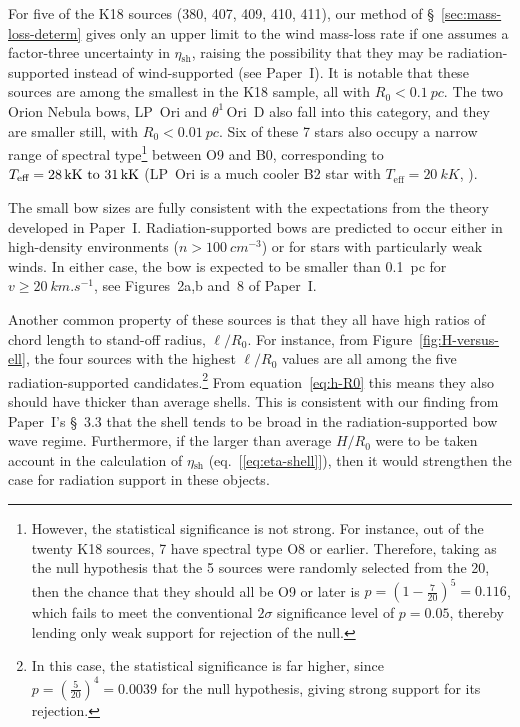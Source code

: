 \documentclass[useAMS, usenatbib, a4paper]{mnras}
\newcommand{\thD}{\(\theta^1\)\,Ori~D}
\newcommand\shell{\ensuremath{_{\text{sh}}}}
\begin{document}
For five of the K18 sources (380, 407, 409, 410, 411), our method of
\S~\ref{sec:mass-loss-determ} gives only an upper limit to the wind
mass-loss rate if one assumes a factor-three uncertainty in
\(\eta\shell\), raising the possibility that they may be
radiation-supported instead of wind-supported (see Paper~I).  It is
notable that these sources are among the smallest in the K18 sample,
all with \(R_0 < \SI{0.1}{pc}\).  The two Orion Nebula bows, LP~Ori
and \thD{} also fall into this category, and they are smaller still,
with \(R_0 < \SI{0.01}{pc}\).  Six of these 7 stars also occupy a
narrow range of spectral type\footnote{%
  However, the statistical significance is not strong.  For
  instance, out of the twenty K18 sources, 7 have spectral type O8 or
  earlier.  Therefore, taking as the null hypothesis that the 5
  sources were randomly selected from the 20, then the chance that
  they should all be O9 or later is
  \(p = (1 - \frac{7}{20})^5 = 0.116\), which fails to meet the
  conventional \(2\sigma\) significance level of \(p = 0.05\),
  thereby lending only weak support for rejection of the null.} %
between O9 and B0, corresponding to
\(T_{\text{eff}} = \text{\SIrange{28}{31}{kK}}\) (LP~Ori is a much
cooler B2 star with \(T_{\text{eff}} = \SI{20}{kK}\),
\citealp{Petit:2008a, Alecian:2013a}).

The small bow sizes are fully consistent with the expectations from
the theory developed in Paper~I.  Radiation-supported bows are predicted
to occur either in high-density environments
(\(n > \SI{100}{cm^{-3}}\)) or for stars with particularly weak winds.
In either case, the bow is expected to be smaller than \SI{0.1}{pc}
for \(v \ge \SI{20}{km.s^{-1}}\), see Figures~2a,b and~8 of
Paper~I.\@

Another common property of these sources is that they all have high
ratios of chord length to stand-off radius, \(\ell/R_0\).  For
instance, from Figure~\ref{fig:H-versus-ell}, the four sources with
the highest \(\ell/R_0\) values are all among the five
radiation-supported candidates.\footnote{%
  In this case, the statistical significance is far higher, since
  \(p = (\frac{5}{20})^4 = 0.0039\) for the null hypothesis, giving
  strong support for its rejection.}  From equation~\eqref{eq:h-R0}
this means they also should have thicker than average shells.  This is
consistent with our finding from Paper~I's \S~3.3 that the shell tends
to be broad in the radiation-supported bow wave regime.  Furthermore,
if the larger than average \(H/R_0\) were to be taken account in the
calculation of \(\eta\shell\) (eq.~[\ref{eq:eta-shell}]), then it
would strengthen the case for radiation support in these objects.
\end{document}
